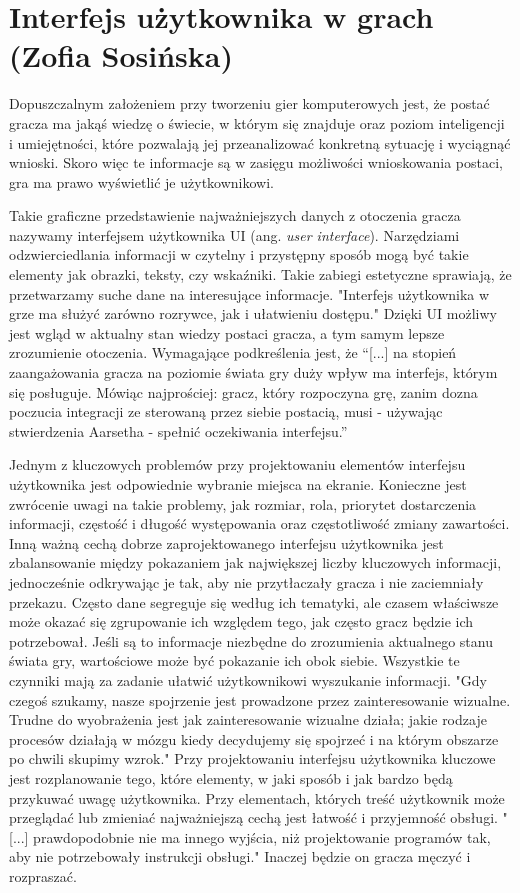 \section{Interfejs użytkownika w grach (Zofia Sosińska)}\label{c:elem_ui}

Dopuszczalnym założeniem przy tworzeniu gier komputerowych jest, że postać gracza ma jakąś wiedzę o świecie, w którym się znajduje oraz
poziom inteligencji i umiejętności, które pozwalają jej przeanalizować konkretną sytuację i wyciągnąć wnioski. Skoro więc te informacje są w zasięgu możliwości wnioskowania postaci, gra ma prawo wyświetlić je użytkownikowi. 

Takie graficzne przedstawienie najważniejszych danych z otoczenia gracza nazywamy interfejsem użytkownika UI (ang. \textit{user interface}). Narzędziami odzwierciedlania informacji
w czytelny i przystępny sposób mogą być takie elementy jak obrazki, teksty, czy wskaźniki. Takie zabiegi estetyczne sprawiają, że przetwarzamy suche dane
na interesujące informacje. "Interfejs użytkownika w grze ma służyć zarówno rozrywce, jak i ułatwieniu dostępu."\cite{projektowanie_podstawy}
Dzięki UI możliwy jest wgląd w aktualny stan wiedzy postaci gracza, a tym samym lepsze
zrozumienie otoczenia. Wymagające podkreślenia jest, że “[...] na stopień zaangażowania gracza na poziomie świata gry duży wpływ ma interfejs, którym się posługuje. Mówiąc najprościej:
gracz, który rozpoczyna grę, zanim dozna poczucia integracji ze sterowaną przez siebie postacią, musi - używając stwierdzenia Aarsetha - spełnić oczekiwania interfejsu.”\cite{olbrzymwcieniu}

Jednym z kluczowych problemów przy projektowaniu elementów interfejsu użytkownika jest odpowiednie wybranie miejsca na ekranie. Konieczne jest zwrócenie uwagi na takie 
problemy, jak  rozmiar, rola, priorytet dostarczenia informacji, częstość i długość występowania oraz częstotliwość zmiany zawartości.
Inną ważną cechą dobrze zaprojektowanego interfejsu użytkownika jest zbalansowanie między pokazaniem jak największej liczby kluczowych informacji, 
jednocześnie odkrywając je tak, aby nie przytłaczały gracza i nie zaciemniały przekazu.
Często dane segreguje się według ich tematyki, ale czasem właściwsze może okazać się zgrupowanie ich 
względem tego, jak często gracz będzie ich potrzebował. Jeśli są to informacje niezbędne do zrozumienia aktualnego 
stanu świata gry, wartościowe może być pokazanie ich obok siebie. Wszystkie te czynniki mają za zadanie ułatwić użytkownikowi
wyszukanie informacji. "Gdy czegoś szukamy, nasze spojrzenie jest prowadzone przez zainteresowanie wizualne.
Trudne do wyobrażenia jest jak zainteresowanie wizualne działa; jakie rodzaje procesów działają w mózgu kiedy decydujemy się spojrzeć i na
którym obszarze po chwili skupimy wzrok."\cite{user_interfaces} Przy projektowaniu interfejsu użytkownika kluczowe jest rozplanowanie
tego, które elementy, w jaki sposób i jak bardzo będą przykuwać uwagę użytkownika. Przy elementach, których treść użytkownik może przeglądać
lub zmieniać najważniejszą cechą jest łatwość i przyjemność obsługi. "[...] prawdopodobnie nie ma innego wyjścia, niż projektowanie programów tak,
 aby nie potrzebowały instrukcji obsługi."\cite{ui_for_programmers} Inaczej będzie on gracza męczyć i rozpraszać.

